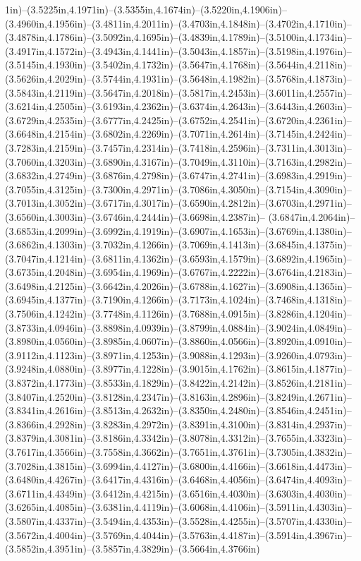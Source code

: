 1in)--(3.5225in,4.1971in)--(3.5355in,4.1674in)--(3.5220in,4.1906in)--(3.4960in,4.1956in)--(3.4811in,4.2011in)--(3.4703in,4.1848in)--(3.4702in,4.1710in)--(3.4878in,4.1786in)--(3.5092in,4.1695in)--(3.4839in,4.1789in)--(3.5100in,4.1734in)--(3.4917in,4.1572in)--(3.4943in,4.1441in)--(3.5043in,4.1857in)--(3.5198in,4.1976in)--(3.5145in,4.1930in)--(3.5402in,4.1732in)--(3.5647in,4.1768in)--(3.5644in,4.2118in)--(3.5626in,4.2029in)--(3.5744in,4.1931in)--(3.5648in,4.1982in)--(3.5768in,4.1873in)--(3.5843in,4.2119in)--(3.5647in,4.2018in)--(3.5817in,4.2453in)--(3.6011in,4.2557in)--(3.6214in,4.2505in)--(3.6193in,4.2362in)--(3.6374in,4.2643in)--(3.6443in,4.2603in)--(3.6729in,4.2535in)--(3.6777in,4.2425in)--(3.6752in,4.2541in)--(3.6720in,4.2361in)--(3.6648in,4.2154in)--(3.6802in,4.2269in)--(3.7071in,4.2614in)--(3.7145in,4.2424in)--(3.7283in,4.2159in)--(3.7457in,4.2314in)--(3.7418in,4.2596in)--(3.7311in,4.3013in)--(3.7060in,4.3203in)--(3.6890in,4.3167in)--(3.7049in,4.3110in)--(3.7163in,4.2982in)--(3.6832in,4.2749in)--(3.6876in,4.2798in)--(3.6747in,4.2741in)--(3.6983in,4.2919in)--(3.7055in,4.3125in)--(3.7300in,4.2971in)--(3.7086in,4.3050in)--(3.7154in,4.3090in)--(3.7013in,4.3052in)--(3.6717in,4.3017in)--(3.6590in,4.2812in)--(3.6703in,4.2971in)--(3.6560in,4.3003in)--(3.6746in,4.2444in)--(3.6698in,4.2387in)--
(3.6847in,4.2064in)--(3.6853in,4.2099in)--(3.6992in,4.1919in)--(3.6907in,4.1653in)--(3.6769in,4.1380in)--(3.6862in,4.1303in)--(3.7032in,4.1266in)--(3.7069in,4.1413in)--(3.6845in,4.1375in)--(3.7047in,4.1214in)--(3.6811in,4.1362in)--(3.6593in,4.1579in)--(3.6892in,4.1965in)--(3.6735in,4.2048in)--(3.6954in,4.1969in)--(3.6767in,4.2222in)--(3.6764in,4.2183in)--(3.6498in,4.2125in)--(3.6642in,4.2026in)--(3.6788in,4.1627in)--(3.6908in,4.1365in)--(3.6945in,4.1377in)--(3.7190in,4.1266in)--(3.7173in,4.1024in)--(3.7468in,4.1318in)--(3.7506in,4.1242in)--(3.7748in,4.1126in)--(3.7688in,4.0915in)--(3.8286in,4.1204in)--(3.8733in,4.0946in)--(3.8898in,4.0939in)--(3.8799in,4.0884in)--(3.9024in,4.0849in)--(3.8980in,4.0560in)--(3.8985in,4.0607in)--(3.8860in,4.0566in)--(3.8920in,4.0910in)--(3.9112in,4.1123in)--(3.8971in,4.1253in)--(3.9088in,4.1293in)--(3.9260in,4.0793in)--(3.9248in,4.0880in)--(3.8977in,4.1228in)--(3.9015in,4.1762in)--(3.8615in,4.1877in)--(3.8372in,4.1773in)--(3.8533in,4.1829in)--(3.8422in,4.2142in)--(3.8526in,4.2181in)--(3.8407in,4.2520in)--(3.8128in,4.2347in)--(3.8163in,4.2896in)--(3.8249in,4.2671in)--(3.8341in,4.2616in)--(3.8513in,4.2632in)--(3.8350in,4.2480in)--(3.8546in,4.2451in)--(3.8366in,4.2928in)--(3.8283in,4.2972in)--(3.8391in,4.3100in)--(3.8314in,4.2937in)--(3.8379in,4.3081in)--(3.8186in,4.3342in)--(3.8078in,4.3312in)--(3.7655in,4.3323in)--(3.7617in,4.3566in)--(3.7558in,4.3662in)--(3.7651in,4.3761in)--(3.7305in,4.3832in)--(3.7028in,4.3815in)--(3.6994in,4.4127in)--(3.6800in,4.4166in)--(3.6618in,4.4473in)--(3.6480in,4.4267in)--(3.6417in,4.4316in)--(3.6468in,4.4056in)--(3.6474in,4.4093in)--(3.6711in,4.4349in)--(3.6412in,4.4215in)--(3.6516in,4.4030in)--(3.6303in,4.4030in)--(3.6265in,4.4085in)--(3.6381in,4.4119in)--(3.6068in,4.4106in)--(3.5911in,4.4303in)--(3.5807in,4.4337in)--(3.5494in,4.4353in)--(3.5528in,4.4255in)--(3.5707in,4.4330in)--(3.5672in,4.4004in)--(3.5769in,4.4044in)--(3.5763in,4.4187in)--(3.5914in,4.3967in)--(3.5852in,4.3951in)--(3.5857in,4.3829in)--(3.5664in,4.3766in)
